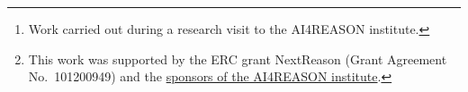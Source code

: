 \author{Codex \texttt{gpt-6-astra}\\OpenAI
\and Michael Kinyon\thanks{Work carried out during a research visit to the AI4REASON institute.}\\University of Denver
\and Josef Urban\thanks{This work was supported by the ERC grant NextReason
(Grant Agreement No.\ 101200949) and the
\href{https://ai4reason.eu/sponsors.html}{sponsors of the AI4REASON institute}.}\\AI4REASON\\University of Gothenburg}
